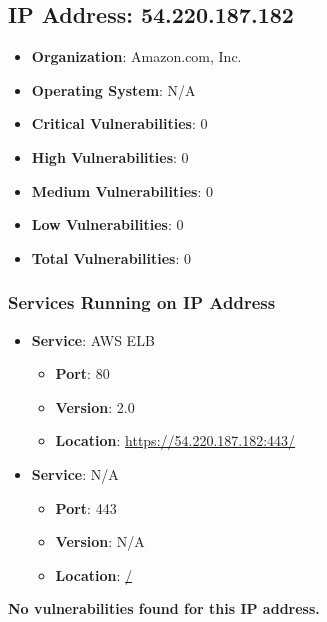 \documentclass{article}
\begin{document}
\clearpage



\subsection*{IP Address: 54.220.187.182}

\begin{itemize}
    \item \textbf{Organization}: Amazon.com, Inc.
    \item \textbf{Operating System}:  N/A 
    \item \textbf{Critical Vulnerabilities}: 0
    \item \textbf{High Vulnerabilities}: 0
    \item \textbf{Medium Vulnerabilities}: 0
    \item \textbf{Low Vulnerabilities}: 0
    \item \textbf{Total Vulnerabilities}: 0
\end{itemize}

\subsubsection*{Services Running on IP Address}

\begin{itemize}
    
        \item \textbf{Service}: AWS ELB
        \begin{itemize}
            \item \textbf{Port}: 80
            \item \textbf{Version}:  2.0 
            \item \textbf{Location}: \href{ https://54.220.187.182:443/ }{ https://54.220.187.182:443/ }
        \end{itemize}
    
        \item \textbf{Service}: N/A
        \begin{itemize}
            \item \textbf{Port}: 443
            \item \textbf{Version}:  N/A 
            \item \textbf{Location}: \href{ / }{ / }
        \end{itemize}
    
\end{itemize}


\textbf{No vulnerabilities found for this IP address.}
\end{document}
